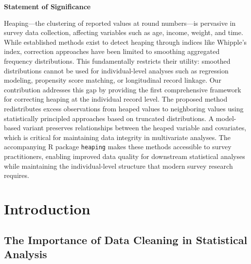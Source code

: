 \documentclass[12pt]{article}
\theoremstyle{plain}
\theoremstyle{definition}
\begin{document}
\vspace{1cm}


\noindent\textbf{Statement of Significance}

\vspace{0.3cm}

\noindent
Heaping---the clustering of reported values at round numbers---is pervasive in survey data collection, affecting variables such as age, income, weight, and time. While established methods exist to detect heaping through indices like Whipple's index, correction approaches have been limited to smoothing aggregated frequency distributions. This fundamentally restricts their utility: smoothed distributions cannot be used for individual-level analyses such as regression modeling, propensity score matching, or longitudinal record linkage. Our contribution addresses this gap by providing the first comprehensive framework for correcting heaping at the individual record level. The proposed method redistributes excess observations from heaped values to neighboring values using statistically principled approaches based on truncated distributions. A model-based variant preserves relationships between the heaped variable and covariates, which is critical for maintaining data integrity in multivariate analyses. The accompanying R package \texttt{heaping} makes these methods accessible to survey practitioners, enabling improved data quality for downstream statistical analyses while maintaining the individual-level structure that modern survey research requires.

\newpage


\section{Introduction}\label{sec1}

\subsection{The Importance of Data Cleaning in Statistical Analysis}
\end{document}
